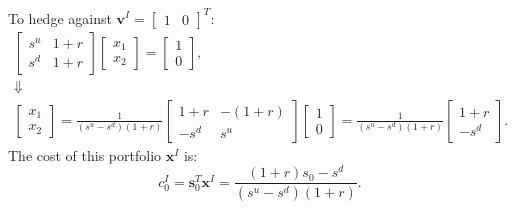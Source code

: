\documentclass[final,3p,times]{elsarticle}
\begin{document}
	To hedge against $\mathbf{v}^{I}=\begin{bmatrix} 1 & 0\end{bmatrix}^T$:
	\begin{gather}
		\begin{bmatrix} s^u & 1+r \\ s^d & 1+r \end{bmatrix}
		\begin{bmatrix} x_1 \\ x_2 \end{bmatrix}
		=
		\begin{bmatrix} 1 \\ 0 \end{bmatrix},\nonumber\\
		\Downarrow\nonumber\\
		\begin{bmatrix} x_1 \\ x_2 \end{bmatrix}
		=
		\frac{1}{\left(s^u-s^d\right)\left(1+r\right)}
		\begin{bmatrix} 1+r & -\left(1+r\right) \\ -s^d & s^u \end{bmatrix}
		\begin{bmatrix} 1 \\ 0 \end{bmatrix}
		=
		\frac{1}{\left(s^u-s^d\right)\left(1+r\right)}
		\begin{bmatrix} 1+r \\ -s^d \end{bmatrix}
		.
	\end{gather}
	The cost of this portfolio $\mathbf{x}^{I}$ is:
	\begin{equation}
		c_0^{I}=\mathbf{s}_0^T\mathbf{x}^{I}=\frac{\left(1+r\right)s_0 - s^d}{\left(s^u-s^d\right)\left(1+r\right)}
		.
	\end{equation}
	
\end{document}
